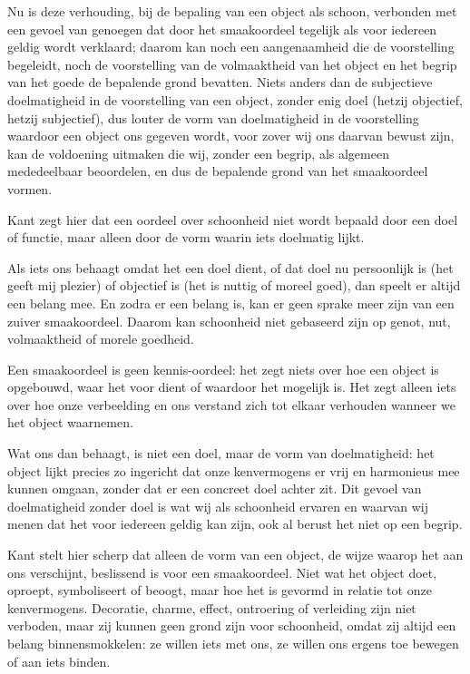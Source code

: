 Nu is deze verhouding, bij de bepaling van een object als schoon, verbonden met een gevoel van genoegen dat door het smaakoordeel tegelijk als voor iedereen geldig wordt verklaard; daarom kan noch een aangenaamheid die de voorstelling begeleidt, noch de voorstelling van de volmaaktheid van het object en het begrip van het goede de bepalende grond bevatten. Niets anders dan de subjectieve doelmatigheid in de voorstelling van een object, zonder enig doel (hetzij objectief, hetzij subjectief), dus louter de vorm van doelmatigheid in de voorstelling waardoor een object ons gegeven wordt, voor zover wij ons daarvan bewust zijn, kan de voldoening uitmaken die wij, zonder een begrip, als algemeen mededeelbaar beoordelen, en dus de bepalende grond van het smaakoordeel vormen.

\begin{mdframed}[leftmargin=0pt,rightmargin=0pt,backgroundcolor=blue!6,linecolor=white,innertopmargin=6pt,innerbottommargin=6pt]
Kant zegt hier dat een oordeel over schoonheid niet wordt bepaald door een doel of functie, maar alleen door de vorm waarin iets doelmatig lijkt.

Als iets ons behaagt omdat het een doel dient, of dat doel nu persoonlijk is (het geeft mij plezier) of objectief is (het is nuttig of moreel goed), dan speelt er altijd een belang mee. En zodra er een belang is, kan er geen sprake meer zijn van een zuiver smaakoordeel. Daarom kan schoonheid niet gebaseerd zijn op genot, nut, volmaaktheid of morele goedheid.

Een smaakoordeel is geen kennis-oordeel: het zegt niets over hoe een object is opgebouwd, waar het voor dient of waardoor het mogelijk is. Het zegt alleen iets over hoe onze verbeelding en ons verstand zich tot elkaar verhouden wanneer we het object waarnemen.

Wat ons dan behaagt, is niet een doel, maar de vorm van doelmatigheid: het object lijkt precies zo ingericht dat onze kenvermogens er vrij en harmonieus mee kunnen omgaan, zonder dat er een concreet doel achter zit. Dit gevoel van doelmatigheid zonder doel is wat wij als schoonheid ervaren en waarvan wij menen dat het voor iedereen geldig kan zijn, ook al berust het niet op een begrip.

\bigskip
Kant stelt hier scherp dat alleen de vorm van een object, de wijze waarop het aan ons verschijnt, beslissend is voor een smaakoordeel. Niet wat het object doet, oproept, symboliseert of beoogt, maar hoe het is gevormd in relatie tot onze kenvermogens. Decoratie, charme, effect, ontroering of verleiding zijn niet verboden, maar zij kunnen geen grond zijn voor schoonheid, omdat zij altijd een belang binnensmokkelen: ze willen iets met ons, ze willen ons ergens toe bewegen of aan iets binden.


\end{mdframed}
